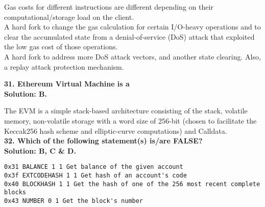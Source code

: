 Gas costs for different instructions are different depending on their computational/storage load on the client.\\

A hard fork to change the gas calculation for certain I/O-heavy operations and to clear the accumulated state from a denial-of-service (DoS) attack that exploited the low gas cost of those operations.\\

A hard fork to address more DoS attack vectors, and another state clearing.
Also, a replay attack protection mechanism.\\

\pagebreak

\textbf{31. Ethereum Virtual Machine is a}\label{sec:exam1_q31}\\

\textbf{Solution: B.}

The EVM is a simple stack-based architecture consisting of the stack, volatile memory, non-volatile storage with a word size of 256-bit (chosen to facilitate the Keccak256 hash scheme and elliptic-curve computations) and Calldata.\\

\textbf{32. Which of the following statement(s) is/are FALSE?}\label{sec:exam1_q32}\\

\textbf{Solution: B, C \& D.}

\begin{lstlisting}[style=defaultStyle]
0x31 BALANCE 1 1 Get balance of the given account
0x3f EXTCODEHASH 1 1 Get hash of an account's code
0x40 BLOCKHASH 1 1 Get the hash of one of the 256 most recent complete blocks
0x43 NUMBER 0 1 Get the block's number
\end{lstlisting}